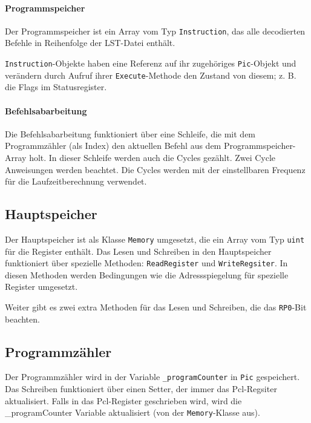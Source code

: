 \paragraph{Programmspeicher}
Der Programmspeicher ist ein Array vom Typ \texttt{Instruction},
das alle decodierten Befehle in Reihenfolge der LST-Datei enthält. 

\texttt{Instruction}-Objekte haben eine Referenz auf ihr zugehöriges \texttt{Pic}-Objekt
und verändern durch Aufruf ihrer \texttt{Execute}-Methode den Zustand von diesem;
z. B. die Flags im Statusregister.


\paragraph{Befehlsabarbeitung}
Die Befehlsabarbeitung funktioniert über eine Schleife,
die mit dem Programmzähler (als Index) den aktuellen Befehl aus dem Programmspeicher-Array holt.
In dieser Schleife werden auch die Cycles gezählt.
Zwei Cycle Anweisungen werden beachtet.
Die Cycles werden mit der einstellbaren Frequenz für die Laufzeitberechnung verwendet. 


\subsection{Hauptspeicher}
Der Hauptspeicher ist als Klasse \texttt{Memory} umgesetzt,
die ein Array vom Typ \texttt{uint} für die Register enthält.
Das Lesen und Schreiben in den Hauptspeicher funktioniert über spezielle Methoden: \texttt{ReadRegister} und \texttt{WriteRegsiter}.
In diesen Methoden werden Bedingungen wie die Adressspiegelung für spezielle Register umgesetzt.


Weiter gibt es zwei extra Methoden für das Lesen und Schreiben,
die das \texttt{RP0}-Bit beachten. 


\subsection{Programmzähler}
Der Programmzähler wird in der Variable \texttt{\_programCounter} in \texttt{Pic} gespeichert.
Das Schreiben funktioniert über einen Setter,
der immer das Pcl-Regsiter aktualisiert.
Falls in das Pcl-Register geschrieben wird,
wird die \_programCounter Variable aktualisiert (von der \texttt{Memory}-Klasse aus).

